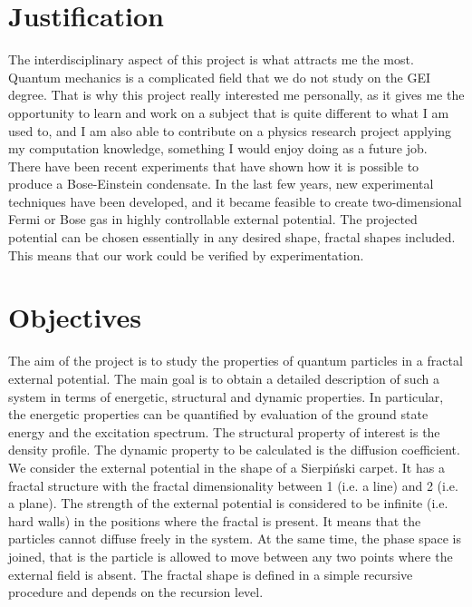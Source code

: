 \documentclass{article}
\begin{document}
\section{Justification}
The interdisciplinary aspect of this project is what attracts me the most. Quantum mechanics is a complicated field that we do not study on the GEI degree. That is why this project really interested me personally, as it gives me the opportunity to learn and work on a subject that is quite different to what I am used to, and I am also able to contribute on a physics research project applying my computation knowledge, something I would enjoy doing as a future job.\\

There have been recent experiments \cite{boseeinstein} that have shown how it is possible to produce a Bose-Einstein condensate. In the last few years, new experimental techniques have been developed, and it became feasible to create two-dimensional Fermi or Bose gas in highly controllable external potential. The projected potential can be chosen essentially in any desired shape, fractal shapes included. This means that our work could be verified by experimentation.

\section{Objectives}
The aim of the project is to study the properties of quantum particles in a fractal external potential. The main goal is to obtain a detailed description of such a system in terms of energetic, structural and dynamic properties. In particular, the energetic properties can be quantified by evaluation of the ground state energy and the excitation spectrum. The structural property of interest is the density profile. The dynamic property to be calculated is the diffusion coefficient.\\

We consider the external potential in the shape of a Sierpiński carpet. It has a fractal structure with the fractal dimensionality between 1 (i.e. a line) and 2 (i.e. a plane). The strength of the external potential is considered to be infinite (i.e. hard walls) in the positions where the fractal is present. It means that the particles cannot diffuse freely in the system. At the same time, the phase space is joined, that is the particle is allowed to move between any two points where the external field is absent. The fractal shape is defined in a simple recursive procedure and depends on the recursion level. \\
\end{document}
